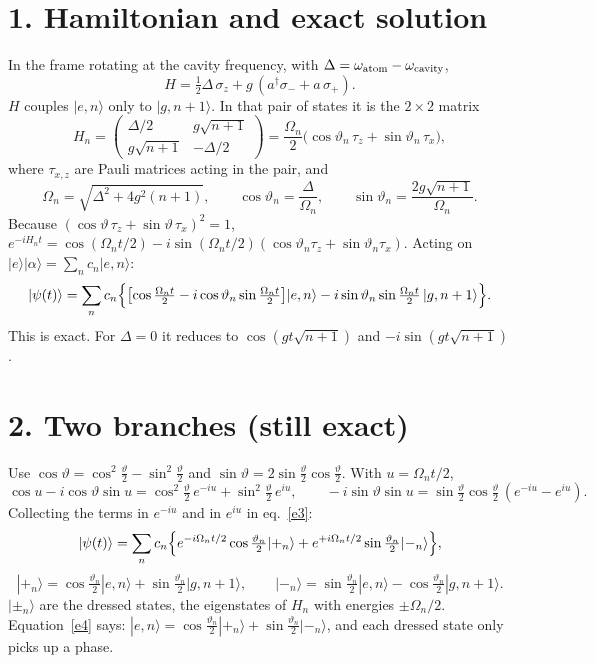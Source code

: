 \documentclass[11pt,letterpaper]{article}
\newcommand{\ket}[1]{|#1\rangle}
\begin{document}
\section*{1. Hamiltonian and exact solution}
In the frame rotating at the cavity frequency, with $\Delta=\omega_{\rm atom}-\omega_{\rm cavity}$,
\begin{equation}\label{e1}
H=\tfrac12\Delta\,\sigma_z+g\,(a^\dagger\sigma_-+a\,\sigma_+).
\end{equation}
$H$ couples $\ket{e,n}$ only to $\ket{g,n+1}$. In that pair of states it is the $2\times2$ matrix
\[
H_n=\begin{pmatrix}\Delta/2 & g\sqrt{n+1}\\ g\sqrt{n+1} & -\Delta/2\end{pmatrix}
=\frac{\Omega_n}{2}\bigl(\cos\vartheta_n\,\tau_z+\sin\vartheta_n\,\tau_x\bigr),
\]
where $\tau_{x,z}$ are Pauli matrices acting in the pair, and
\begin{equation}\label{e2}
\Omega_n=\sqrt{\Delta^2+4g^2(n+1)},\qquad \cos\vartheta_n=\frac{\Delta}{\Omega_n},\qquad
\sin\vartheta_n=\frac{2g\sqrt{n+1}}{\Omega_n}.
\end{equation}
Because $(\cos\vartheta\,\tau_z+\sin\vartheta\,\tau_x)^2=1$,
$e^{-iH_nt}=\cos(\Omega_nt/2)-i\sin(\Omega_nt/2)(\cos\vartheta_n\tau_z+\sin\vartheta_n\tau_x)$.
Acting on $\ket{e}\ket{\alpha}=\sum_nc_n\ket{e,n}$:
\begin{equation}\label{e3}
\ket{\psi(t)}=\sum_nc_n\Bigl\{\bigl[\cos\tfrac{\Omega_nt}{2}-i\cos\vartheta_n\sin\tfrac{\Omega_nt}{2}\bigr]\ket{e,n}
-i\sin\vartheta_n\sin\tfrac{\Omega_nt}{2}\,\ket{g,n+1}\Bigr\}.
\end{equation}
This is exact. For $\Delta=0$ it reduces to $\cos(gt\sqrt{n+1})$ and $-i\sin(gt\sqrt{n+1})$.

\section*{2. Two branches (still exact)}
Use $\cos\vartheta=\cos^2\tfrac\vartheta2-\sin^2\tfrac\vartheta2$ and
$\sin\vartheta=2\sin\tfrac\vartheta2\cos\tfrac\vartheta2$. With $u=\Omega_nt/2$,
\[
\cos u-i\cos\vartheta\sin u=\cos^2\tfrac\vartheta2\,e^{-iu}+\sin^2\tfrac\vartheta2\,e^{iu},\qquad
-i\sin\vartheta\sin u=\sin\tfrac\vartheta2\cos\tfrac\vartheta2\,(e^{-iu}-e^{iu}).
\]
Collecting the terms in $e^{-iu}$ and in $e^{iu}$ in eq.~\eqref{e3}:
\begin{equation}\label{e4}
\ket{\psi(t)}=\sum_nc_n\Bigl\{e^{-i\Omega_nt/2}\cos\tfrac{\vartheta_n}{2}\ket{+_n}
+e^{+i\Omega_nt/2}\sin\tfrac{\vartheta_n}{2}\ket{-_n}\Bigr\},
\end{equation}
\[
\ket{+_n}=\cos\tfrac{\vartheta_n}{2}\ket{e,n}+\sin\tfrac{\vartheta_n}{2}\ket{g,n+1},\qquad
\ket{-_n}=\sin\tfrac{\vartheta_n}{2}\ket{e,n}-\cos\tfrac{\vartheta_n}{2}\ket{g,n+1}.
\]
$\ket{\pm_n}$ are the dressed states, the eigenstates of $H_n$ with energies $\pm\Omega_n/2$.
Equation~\eqref{e4} says: $\ket{e,n}=\cos\tfrac{\vartheta_n}{2}\ket{+_n}+\sin\tfrac{\vartheta_n}{2}\ket{-_n}$,
and each dressed state only picks up a phase.
\end{document}
